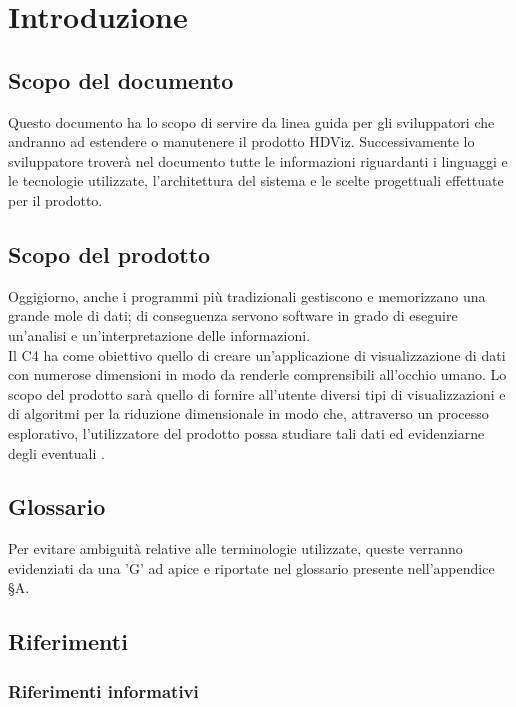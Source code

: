 \section{Introduzione}
\subsection{Scopo del documento}
Questo documento ha lo scopo di servire da linea guida per gli sviluppatori che andranno ad estendere o manutenere il prodotto HDViz. Successivamente lo sviluppatore troverà nel documento tutte le informazioni riguardanti i linguaggi e le tecnologie utilizzate, l'architettura del sistema e le scelte progettuali effettuate per il prodotto.

\subsection{Scopo del prodotto}
Oggigiorno, anche i programmi più tradizionali gestiscono e memorizzano una grande mole di dati; di conseguenza servono software in grado di eseguire un'analisi e un'interpretazione delle informazioni.\\
Il  C4 ha come obiettivo quello di creare un'applicazione di visualizzazione di dati con numerose dimensioni in modo da renderle comprensibili all'occhio umano.  Lo scopo del prodotto sarà quello di fornire all'utente diversi tipi di visualizzazioni e di algoritmi per la riduzione dimensionale in modo che, attraverso un processo esplorativo, l'utilizzatore del prodotto possa studiare tali dati ed evidenziarne degli eventuali . 

\subsection{Glossario}
Per evitare ambiguità relative alle terminologie utilizzate, queste verranno evidenziati da una 'G' ad apice e riportate nel glossario presente nell'appendice \S A.

\subsection{Riferimenti}

\subsubsection{Riferimenti informativi}
\label{riferimenti}
\begin{itemize}

\end{itemize}
	